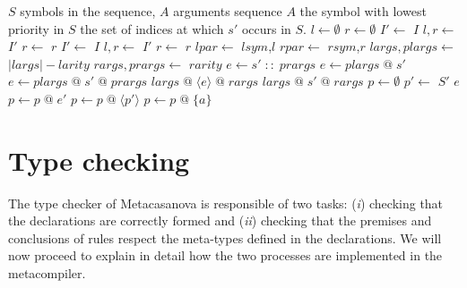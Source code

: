 \begin{algorithm}
	\small
	\caption{Parenthesization of a sequence of arguments. The operators :: and @ are respectively prepend and append on a list. With the notation $\langle S \rangle$ we denote a sequence $S$ enclosed by parentheses.}
	\label{alg:ch_metacasanova_parenthesization}
	\begin{algorithmic}
		 {$S$ symbols in the sequence, $A$ arguments sequence}
				\State \Return $A$
			\Else
					 {the symbol with lowest priority in $S$}
					 {the set of indices at which $s'$ occurs in $S$.}
					\State $l \gets \emptyset$
					\State $r \gets \emptyset$
						\State $I' \gets $   {$I$}
						\State $l,r \gets$  {$I'$}
						\State $r \gets$  {$r$}
					\Else
						\State $I' \gets $   {$I$}
						\State $l,r \gets$  {$I'$}
						\State $r \gets$  {$r$}
					\EndIf
					\State $lpar \gets$  {$lsym$,$l$}
					\State $rpar \gets$  {$rsym$,$r$}
					\State $largs,plargs \gets$  {$|largs| - larity$}
					\State $rargs,prargs \gets$  {$rarity$}
							\State $e \gets s' \; :: \; prargs$
							\State $e \gets plargs \; @ \; s'$
							\State $e \gets plargs \; @ \; s' \; @ \; prargs$
						\EndIf
						\State \Return $largs \; @ \; \langle e \rangle \; @ \; rargs$
					\Else
						\State \Return $largs \; @ \; s' \; @ \; rargs$
					\EndIf
				\Else
					\State $p \gets \emptyset$
							\State $p' \gets$  {$S'$} {$e$}
								\State $p \gets p \; @ \; e'$
							\Else
								\State $p \gets p \; @ \; \langle p' \rangle$
							\EndIf
						\Else
							\State $p \gets p \; @ \; \lbrace a \rbrace$
						\EndIf
					\EndFor
				\EndIf
			\EndIf		
		\EndFunction
	\end{algorithmic}
\end{algorithm}

\section{Type checking}
\label{sec:ch_metacasanova_type_checking}
The type checker of Metacasanova is responsible of two tasks: (\textit{i}) checking that the declarations are correctly formed and (\textit{ii}) checking that the premises and conclusions of rules respect the meta-types defined in the declarations. We will now proceed to explain in detail how the two processes are implemented in the metacompiler.

